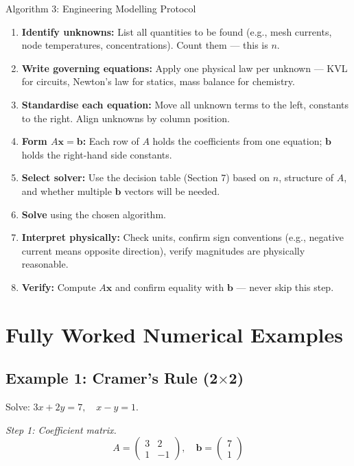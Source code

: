\documentclass[12pt,a4paper]{article}
\begin{document}
\begin{learnbox}{Algorithm 3: Engineering Modelling Protocol}
\begin{enumerate}[noitemsep]
  \item \textbf{Identify unknowns:} List all quantities to be found (e.g., mesh currents, node temperatures, concentrations). Count them --- this is \(n\).
  \item \textbf{Write governing equations:} Apply one physical law per unknown --- KVL for circuits, Newton's law for statics, mass balance for chemistry.
  \item \textbf{Standardise each equation:} Move all unknown terms to the left, constants to the right. Align unknowns by column position.
  \item \textbf{Form \(A\mathbf{x} = \mathbf{b}\):} Each row of \(A\) holds the coefficients from one equation; \(\mathbf{b}\) holds the right-hand side constants.
  \item \textbf{Select solver:} Use the decision table (Section 7) based on \(n\), structure of \(A\), and whether multiple \(\mathbf{b}\) vectors will be needed.
  \item \textbf{Solve} using the chosen algorithm.
  \item \textbf{Interpret physically:} Check units, confirm sign conventions (e.g., negative current means opposite direction), verify magnitudes are physically reasonable.
  \item \textbf{Verify:} Compute \(A\mathbf{x}\) and confirm equality with \(\mathbf{b}\) --- never skip this step.
\end{enumerate}
\end{learnbox}

\section{Fully Worked Numerical Examples}

\subsection*{Example 1: Cramer's Rule (2$\times$2)}

Solve: \(3x + 2y = 7,\quad x - y = 1\).

\textit{Step 1: Coefficient matrix.}
\[
A = \begin{pmatrix} 3 & 2 \\ 1 & -1 \end{pmatrix}, \quad \mathbf{b} = \begin{pmatrix} 7 \\ 1 \end{pmatrix}
\]
\end{document}
